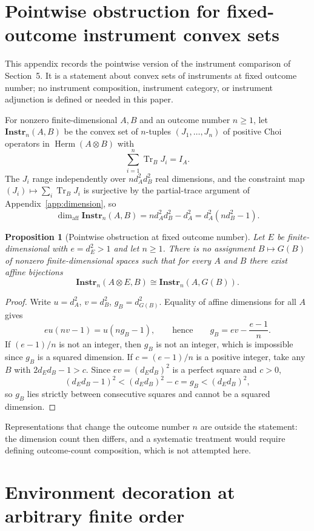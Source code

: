 \documentclass[11pt,a4paper]{article}
\theoremstyle{definition}
\theoremstyle{plain}
\newtheorem{proposition}[theorem]{Proposition}
\theoremstyle{remark}
\DeclareMathOperator{\Tr}{Tr}
\DeclareMathOperator{\Herm}{Herm}
\newcommand{\affdim}{\dim_{\mathrm{aff}}}
\begin{document}
\section{Pointwise obstruction for fixed-outcome instrument convex sets}
\label{app:instr}

This appendix records the pointwise version of the instrument comparison
of Section~5. It is a statement about convex sets of instruments at
fixed outcome number; no instrument composition, instrument category, or
instrument adjunction is defined or needed in this paper.

For nonzero finite-dimensional $A,B$ and an outcome number $n\geq1$, let
$\mathbf{Instr}_n(A,B)$ be the convex set of $n$-tuples
$(J_1,\dots,J_n)$ of positive Choi operators in $\Herm(A\otimes B)$
with
\[
\sum_{i=1}^n\Tr_BJ_i=I_A.
\]
The $J_i$ range independently over $n d_A^2d_B^2$ real dimensions, and
the constraint map $(J_i)\mapsto\sum_i\Tr_BJ_i$ is surjective by the
partial-trace argument of Appendix~\ref{app:dimension}, so
\[
\affdim\mathbf{Instr}_n(A,B)=nd_A^2d_B^2-d_A^2=d_A^2(nd_B^2-1).
\]

\begin{proposition}[Pointwise obstruction at fixed outcome number]
Let $E$ be finite-dimensional with $e=d_E^2>1$ and let $n\geq1$.
There is no assignment $B\mapsto G(B)$ of nonzero finite-dimensional
spaces such that for every $A$ and $B$ there exist affine bijections
\[
\mathbf{Instr}_n(A\otimes E,B)\cong\mathbf{Instr}_n(A,G(B)).
\]
\end{proposition}
\begin{proof}
Write $u=d_A^2$, $v=d_B^2$, $g_B=d_{G(B)}^2$. Equality of affine
dimensions for all $A$ gives
\[
eu(nv-1)=u(ng_B-1),
\qquad\text{hence}\qquad
g_B=ev-\frac{e-1}{n}.
\]
If $(e-1)/n$ is not an integer, then $g_B$ is not an integer, which is
impossible since $g_B$ is a squared dimension. If $c=(e-1)/n$ is a
positive integer, take any $B$ with $2d_Ed_B-1>c$. Since
$ev=(d_Ed_B)^2$ is a perfect square and $c>0$,
\[
(d_Ed_B-1)^2<(d_Ed_B)^2-c=g_B<(d_Ed_B)^2,
\]
so $g_B$ lies strictly between consecutive squares and cannot be a
squared dimension.
\end{proof}

Representations that change the outcome number $n$ are outside the
statement: the dimension count then differs, and a systematic treatment
would require defining outcome-count composition, which is not attempted
here.

\section{Environment decoration at arbitrary finite order}
\label{app:allorders}
\end{document}
